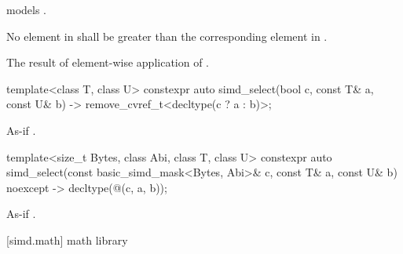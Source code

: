 \begin{itemdescr}
  \pnum\constraints
   models .

  \pnum\expects
  No element in  shall be greater than the corresponding element in .

  \pnum\returns
  The result of element-wise application of  \foralli.
\end{itemdescr}

\begin{itemdecl}
  template<class T, class U>
    constexpr auto simd_select(bool c, const T& a, const U& b)
    -> remove_cvref_t<decltype(c ? a : b)>;
\end{itemdecl}

\begin{itemdescr}
    \pnum\returns As-if .
\end{itemdescr}

\begin{itemdecl}
  template<size_t Bytes, class Abi, class T, class U>
    constexpr auto simd_select(const basic_simd_mask<Bytes, Abi>& c, const T& a, const U& b)
    noexcept -> decltype(@\simdselect@(c, a, b));
\end{itemdecl}

\begin{itemdescr}
    \pnum\returns As-if .
\end{itemdescr}

[simd.math]{ math library}

